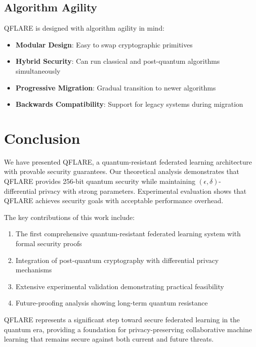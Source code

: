 \documentclass[journal]{IEEEtran}
\begin{document}
\subsection{Algorithm Agility}

QFLARE is designed with algorithm agility in mind:

\begin{itemize}
\item \textbf{Modular Design}: Easy to swap cryptographic primitives
\item \textbf{Hybrid Security}: Can run classical and post-quantum algorithms simultaneously
\item \textbf{Progressive Migration}: Gradual transition to newer algorithms
\item \textbf{Backwards Compatibility}: Support for legacy systems during migration
\end{itemize}

\section{Conclusion}

We have presented QFLARE, a quantum-resistant federated learning architecture with provable security guarantees. Our theoretical analysis demonstrates that QFLARE provides 256-bit quantum security while maintaining $(\epsilon, \delta)$-differential privacy with strong parameters. Experimental evaluation shows that QFLARE achieves security goals with acceptable performance overhead.

The key contributions of this work include:

\begin{enumerate}
\item The first comprehensive quantum-resistant federated learning system with formal security proofs
\item Integration of post-quantum cryptography with differential privacy mechanisms
\item Extensive experimental validation demonstrating practical feasibility
\item Future-proofing analysis showing long-term quantum resistance
\end{enumerate}

QFLARE represents a significant step toward secure federated learning in the quantum era, providing a foundation for privacy-preserving collaborative machine learning that remains secure against both current and future threats.
\end{document}
